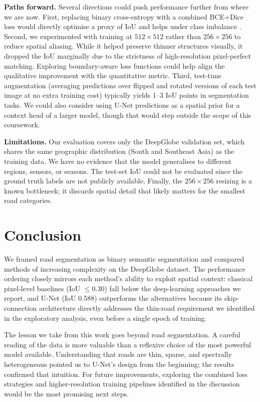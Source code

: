 \documentclass[conference]{IEEEtran}
\begin{document}
\textbf{Paths forward.}
Several directions could push performance further from where we are now.
First, replacing binary cross-entropy with a combined BCE+Dice loss would directly optimise
a proxy of IoU and helps under class imbalance \cite{milletari2016vnet}.
Second, we experimented with training at $512 \times 512$ rather than $256 \times 256$ to reduce spatial
aliasing. While it helped preserve thinner structures visually, it dropped the IoU marginally due to the strictness of high-resolution pixel-perfect matching. Exploring boundary-aware loss functions could help align the qualitative improvement with the quantitative metric.
Third, test-time augmentation (averaging predictions over flipped and rotated versions of
each test image at no extra training cost) typically yields 1--3 IoU points in segmentation
tasks.
We could also consider using U-Net predictions as a spatial prior for a context head of a
larger model, though that would step outside the scope of this coursework.

\textbf{Limitations.}
Our evaluation covers only the DeepGlobe validation set, which shares the same geographic
distribution (South and Southeast Asia) as the training data.
We have no evidence that the model generalises to different regions, sensors, or seasons.
The test-set IoU could not be evaluated since the ground truth labels are not publicly available.
Finally, the $256 \times 256$ resizing is a known bottleneck; it discards spatial detail
that likely matters for the smallest road categories.

\section{Conclusion}
\label{sec:conclusion}

We framed road segmentation as binary semantic segmentation and compared methods of
increasing complexity on the DeepGlobe dataset.
The performance ordering closely mirrors each method's ability to exploit spatial context:
classical pixel-level baselines (IoU $\leq 0.30$) fall below the deep-learning approaches we
report, and U-Net (IoU 0.588) outperforms the alternatives because its skip-connection
architecture directly addresses the thin-road requirement we identified in the exploratory
analysis, even before a single epoch of training.

The lesson we take from this work goes beyond road segmentation.
A careful reading of the data is more valuable than a reflexive choice of the most powerful
model available.
Understanding that roads are thin, sparse, and spectrally heterogeneous pointed us to
U-Net's design from the beginning; the results confirmed that intuition.
For future improvements, exploring the combined loss strategies and higher-resolution
training pipelines identified in the discussion would be the most promising next steps.



\end{document}
